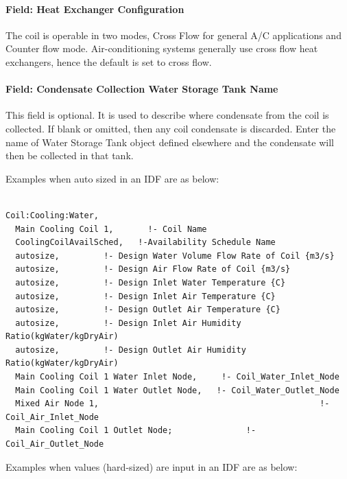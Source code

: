 \paragraph{Field: Heat Exchanger Configuration}\label{field-heat-exchanger-configuration-000}

The coil is operable in two modes, Cross Flow for general A/C applications and Counter flow mode. Air-conditioning systems generally use cross flow heat exchangers, hence the default is set to cross flow.

\paragraph{Field: Condensate Collection Water Storage Tank Name}\label{field-condensate-collection-water-storage-tank-name}

This field is optional. It is used to describe where condensate from the coil is collected. If blank or omitted, then any coil condensate is discarded. Enter the name of Water Storage Tank object defined elsewhere and the condensate will then be collected in that tank.

Examples when auto sized in an IDF are as below:

\begin{lstlisting}

Coil:Cooling:Water,
  Main Cooling Coil 1,       !- Coil Name
  CoolingCoilAvailSched,   !-Availability Schedule Name
  autosize,         !- Design Water Volume Flow Rate of Coil {m3/s}
  autosize,         !- Design Air Flow Rate of Coil {m3/s}
  autosize,         !- Design Inlet Water Temperature {C}
  autosize,         !- Design Inlet Air Temperature {C}
  autosize,         !- Design Outlet Air Temperature {C}
  autosize,         !- Design Inlet Air Humidity Ratio(kgWater/kgDryAir)
  autosize,         !- Design Outlet Air Humidity Ratio(kgWater/kgDryAir)
  Main Cooling Coil 1 Water Inlet Node,     !- Coil_Water_Inlet_Node
  Main Cooling Coil 1 Water Outlet Node,   !- Coil_Water_Outlet_Node
  Mixed Air Node 1,                                             !- Coil_Air_Inlet_Node
  Main Cooling Coil 1 Outlet Node;               !- Coil_Air_Outlet_Node
\end{lstlisting}

Examples when values (hard-sized) are input in an IDF are as below:

